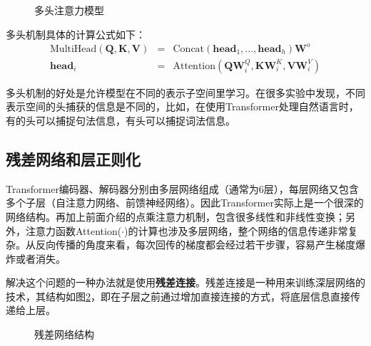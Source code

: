 \begin{figure}[htp]
\centering

\caption{多头注意力模型}
\label{fig:6-48}
\end{figure}

\parinterval 多头机制具体的计算公式如下：
\begin{eqnarray}
\textrm{MultiHead}(\mathbf{Q}, \mathbf{K} , \mathbf{V})& = & \textrm{Concat} (\mathbf{head}_1, ... , \mathbf{head}_h ) \mathbf{W}^o \label{eq:6-48} \\
\mathbf{head}_i & = &\textrm{Attention} (\mathbf{Q}\mathbf{W}_i^Q , \mathbf{K}\mathbf{W}_i^K  , \mathbf{V}\mathbf{W}_i^V )
\label{eq:6-49}
\end{eqnarray}

\parinterval 多头机制的好处是允许模型在不同的表示子空间里学习。在很多实验中发现，不同表示空间的头捕获的信息是不同的，比如，在使用Transformer处理自然语言时，有的头可以捕捉句法信息，有头可以捕捉词法信息。


\subsection{残差网络和层正则化}

\parinterval Transformer编码器、解码器分别由多层网络组成（通常为6层），每层网络又包含多个子层（自注意力网络、前馈神经网络）。因此Transformer实际上是一个很深的网络结构。再加上前面介绍的点乘注意力机制，包含很多线性和非线性变换；另外，注意力函数Attention($\cdot$)的计算也涉及多层网络，整个网络的信息传递非常复杂。从反向传播的角度来看，每次回传的梯度都会经过若干步骤，容易产生梯度爆炸或者消失。

\parinterval 解决这个问题的一种办法就是使用{\small\sffamily\bfseries{残差连接}}\cite{DBLP:journals/corr/HeZRS15}。残差连接是一种用来训练深层网络的技术，其结构如图\ref{fig:6-49}，即在子层之前通过增加直接连接的方式，将底层信息直接传递给上层。

\begin{figure}[htp]
\centering

\caption{残差网络结构}
\label{fig:6-49}
\end{figure}


